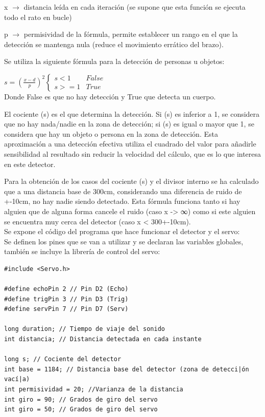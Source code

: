 \documentclass[12pt,twocolumn]{article}
\begin{document}
x $\rightarrow$ distancia leída en cada iteración (se supone que esta función se ejecuta todo el rato en bucle)

p $\rightarrow$ permisividad de la fórmula, permite establecer un rango en el que la detección se mantenga nula (reduce el movimiento errático del brazo).

Se utiliza la siguiente fórmula para la detección de personas u objetos:

$s=\left(\frac{x-d}{p}\right)^{2}\begin{cases}
s<1 & False\\
s>=1 & True
\end{cases}$\\ Donde False es que no hay detección y True que detecta un cuerpo.

El cociente (s) es el que determina la detección. Si (s) es inferior a 1, se considera que no hay nada/nadie en la zona de detección; si (s) es igual o mayor que 1, se considera que hay un objeto o persona en la zona de detección. Esta aproximación a una detección efectiva utiliza el cuadrado del valor para añadirle sensibilidad al resultado sin reducir la velocidad del cálculo, que es lo que interesa en este detector.

Para la obtención de los casos del cociente (s) y el divisor interno se ha calculado que a una distancia base de 300cm, considerando una diferencia de ruido de +-10cm, no hay nadie siendo detectado. Esta fórmula funciona tanto si hay alguien que de alguna forma cancele el ruido (caso x -> ∞) como si este alguien se encuentra muy cerca del detector (caso x < 300+-10cm).\\

Se expone el código del programa que hace funcionar el detector y el servo:\\

Se definen los pines que se van a 
utilizar y se declaran las variables
globales, también se incluye la 
librería de control del servo:

\begin{lstlisting}[texcl=true]
#include <Servo.h>

#define echoPin 2 // Pin D2 (Echo)
#define trigPin 3 // Pin D3 (Trig)
#define servPin 7 // Pin D7 (Serv)

long duration; // Tiempo de viaje del sonido
int distancia; // Distancia detectada en cada instante

long s; // Cociente del detector
int base = 1184; // Distancia base del detector (zona de detecci|ón vací|a)
int permisividad = 20; //Varianza de la distancia
int giro = 90; // Grados de giro del servo
int giro = 50; // Grados de giro del servo

\end{lstlisting}
\end{document}
